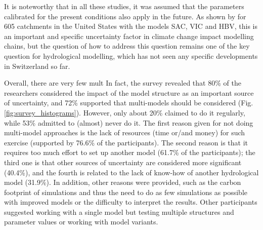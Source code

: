 \documentclass[10pt,a4paper]{article}
\begin{document}
It is noteworthy that in all these studies, it was assumed that the parameters calibrated for the present conditions also apply in the future. As shown by \citet{Melsen2021} for 605 catchments in the United States with the models SAC, VIC and HBV, this is an important and specific uncertainty factor in climate change impact modelling chains, but the question of how to address this question remains one of the key question for hydrological modelling, which has not seen any specific developments in Switzerland so far. 

Overall, there are very few mult
In fact, the survey revealed that 80\% of the researchers considered the impact of the model structure as an important source of uncertainty, and 72\% supported that multi-models should be considered (Fig. \ref{fig:survey_histograms}). However, only about 20\% claimed to do it regularly, while 53\% admitted to (almost) never do it. The first reason given for not doing multi-model approaches is the lack of resources (time or/and money) for such exercise (supported by 76.6\% of the participants). The second reason is that it requires too much effort to set up another model (61.7\% of the participants); the third one is that other sources of uncertainty are considered more significant (40.4\%), and the fourth is related to the lack of know-how of another hydrological model (31.9\%). In addition, other reasons were provided, such as the carbon footprint of simulations and thus the need to do as few simulations as possible with improved models or the difficulty to interpret the results. Other participants suggested working with a single model but testing multiple structures and parameter values or working with model variants.
\end{document}
